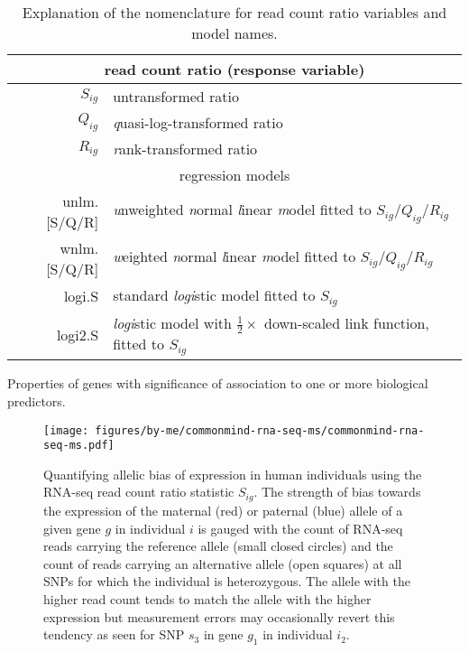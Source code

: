 \documentclass[letterpaper]{article}
\begin{document}
\begin{table}
\begin{tabular}{r|l}
\multicolumn{2}{c}{read count ratio (response variable)} \\
\hline
\(S_{ig}\) & untransformed ratio \\
\(Q_{ig}\) & \emph{q}uasi-log-transformed ratio \\
\(R_{ig}\) & \emph{r}ank-transformed ratio \\
\hline
\multicolumn{2}{c}{regression models} \\
\hline
unlm.[S/Q/R] & \emph{u}nweighted \emph{n}ormal \emph{l}inear \emph{m}odel fitted to \(S_{ig}\)/\(Q_{ig}\)/\(R_{ig}\)\\
wnlm.[S/Q/R] & \emph{w}eighted \emph{n}ormal \emph{l}inear \emph{m}odel fitted to \(S_{ig}\)/\(Q_{ig}\)/\(R_{ig}\)\\
logi.S & standard \emph{logi}stic model fitted to \(S_{ig}\)\\
logi2.S & \emph{logi}stic model with \(\frac{1}{2}\times\) down-scaled link function, fitted to \(S_{ig}\) \\
\end{tabular}
\caption{Explanation of the nomenclature for read count ratio variables and
model names.}
\label{tab:model-names}
\end{table}

\begin{table}[h]
\footnotesize

\caption{
Properties of genes with significance of association to one or more biological predictors.
}
\label{tab:signif-gene-effects}
\end{table}

\begin{figure}[h]
\begin{center}
\texttt{[image: figures/by-me/commonmind-rna-seq-ms/commonmind-rna-seq-ms.pdf]}
\end{center}
\caption{ Quantifying allelic bias of expression in human
individuals using the RNA-seq read count ratio statistic \(S_{ig}\).  The strength of
bias towards the expression of the maternal (red) or paternal (blue) allele of
a given gene \(g\) in individual \(i\) is gauged with the count of RNA-seq
reads carrying the reference allele (small closed circles) and the count of
reads carrying an alternative allele (open squares) at all SNPs for which the
individual is heterozygous.  The allele with the higher read count tends to
match the allele with the higher expression but measurement errors may
occasionally revert this tendency as seen for SNP \(s_3\) in gene \(g_1\) in
individual \(i_2\).
}
\label{fig:study-design}
\end{figure}
\end{document}
